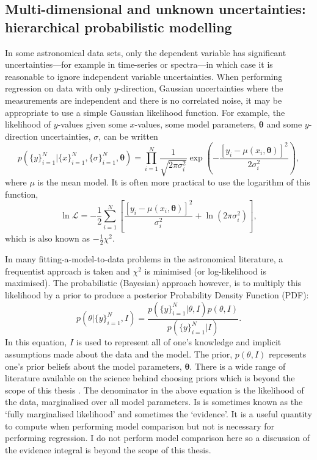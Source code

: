 \subsection{Multi-dimensional and unknown uncertainties: hierarchical
probabilistic modelling}
In some astronomical data sets, only the dependent variable has significant
uncertainties---for example in time-series or spectra---in which case it is
reasonable to ignore independent variable uncertainties.
When performing regression on data with only $y$-direction, Gaussian
uncertainties where the measurements are independent and there is no
correlated noise, it may be appropriate to use a simple Gaussian likelihood
function.
For example, the likelihood of $y$-values given some $x$-values, some model
parameters, $\mathbf{\theta}$ and some $y$-direction uncertainties, $\sigma$,
can be written
\begin{equation}
    p(\{y\}_{i=1}^N|\{x\}_{i=1}^N, \{\sigma\}_{i=1}^N, \mathbf{\theta})
    = \prod_{i=1}^N \frac{1}{\sqrt{2\pi\sigma_i^2}}
    \exp\left(-\frac{[y_i - \mu(x_i, \mathbf{\theta})]^2}{2\sigma_i^2}\right),
\end{equation}
where $\mu$ is the mean model.
It is often more practical to use the logarithm of this function,
\begin{equation}
    \ln\mathcal{L} =
    -\frac{1}{2} \sum_{i=1}^N \left[\frac{[y_i - \mu(x_i,
    \mathbf{\theta})]^2}{\sigma_i^2} +
    \ln\left(2\pi\sigma_i^2\right) \right],
\end{equation}
\label{eq:lnlike_intro}
which is also known as $-\frac{1}{2}\chi^2$.

In many fitting-a-model-to-data problems in the astronomical literature, a
frequentist approach is taken and $\chi^2$ is minimised (or log-likelihood is
maximised).
The probabilistic (Bayesian) approach however, is to multiply this likelihood
by a prior to produce a posterior Probability Density Function (PDF):
\begin{equation}
    p(\theta|\{y\}_{i=1}^N, I) = \frac{p(\{y\}_{i=1}^N|\theta, I)
    p(\theta, I)}{p(\{y\}_{i=1}^N|I)}.
\end{equation}
In this equation, $I$ is used to represent all of one's knowledge and
implicit assumptions made about the data and the model.
The prior, $p(\theta, I)$ represents one's prior beliefs about the model
parameters, $\mathbf{\theta}$.
There is a wide range of literature available on the science behind choosing
priors which is beyond the scope of this thesis \citep[\eg][]{Kass1996,
Gelman2009, Vanderplas2014}.
The denominator in the above equation is the likelihood of the data,
marginalised over all model parameters.
Is is sometimes known as the `fully marginalised likelihood' and sometimes the
`evidence'.
It is a useful quantity to compute when performing model comparison but not
is necessary for performing regression.
I do not perform model comparison here so a discussion of the evidence
integral is beyond the scope of this thesis.

